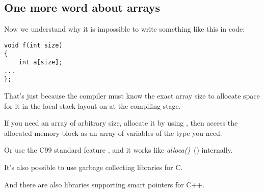 \subsection{One more word about arrays}


Now we understand why it is impossible to write something like this in \CCpp code:

\begin{lstlisting}[style=customc]
void f(int size)
{
    int a[size];
...
};
\end{lstlisting}


That's just because the compiler must know the exact array size to allocate space for 
it in the local stack layout on at the compiling stage.


If you need an array of arbitrary size, allocate it by using , then access the allocated memory block
as an array of variables of the type you need.


Or use the C99 standard feature ,
and it works like \emph{alloca()}~() internally.


It's also possible to use garbage collecting libraries for C.

And there are also libraries supporting smart pointers for C++.

